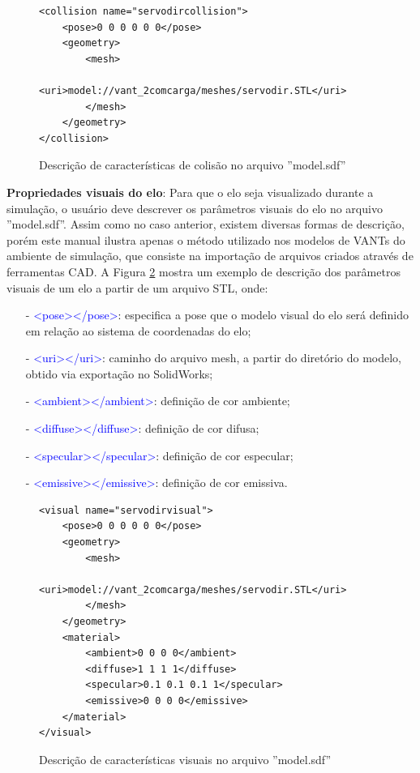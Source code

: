 \begin{figure}[ht!]
\begin{verbatim}
<collision name="servodircollision">
	<pose>0 0 0 0 0 0</pose>
	<geometry>
		<mesh>
			<uri>model://vant_2comcarga/meshes/servodir.STL</uri>
		</mesh>
	</geometry>
</collision>
\end{verbatim}
\vspace{-0.8cm}
\caption{Descrição de características de colisão no arquivo ''model.sdf''}
\label{colision}
\end{figure}

\noindent \textbf{Propriedades visuais do elo}: Para que o elo seja visualizado durante a simulação, o usuário deve descrever os parâmetros visuais do elo no arquivo ''model.sdf''. Assim como no caso anterior, existem diversas formas de descrição, porém este manual ilustra apenas o método utilizado nos modelos de VANTs do ambiente de simulação, que consiste na importação de arquivos criados através de ferramentas CAD. A Figura \ref{visual} mostra um exemplo de descrição dos parâmetros visuais de um elo a partir de um arquivo STL, 	
onde: \small
\begin{itemize}
\setlength{\itemsep}{1pt}
\setlength{\parskip}{0pt}
\setlength{\parsep}{0pt}
\item[-] \textcolor{blue}{<pose></pose>}: especifica a pose que o modelo visual do elo será definido em relação ao sistema de coordenadas do elo;
\item[-] \textcolor{blue}{<uri></uri>}: caminho do arquivo mesh, a partir do diretório do modelo, obtido via exportação no SolidWorks;
\item[-] \textcolor{blue}{<ambient></ambient>}: definição de cor ambiente;
\item[-] \textcolor{blue}{<diffuse></diffuse>}: definição de cor difusa;
\item[-] \textcolor{blue}{<specular></specular>}: definição de cor especular;
\item[-] \textcolor{blue}{<emissive></emissive>}: definição de cor emissiva.
\end{itemize} \normalsize

\begin{figure}[ht!]
\begin{verbatim}
<visual name="servodirvisual">
	<pose>0 0 0 0 0 0</pose>
	<geometry>
		<mesh>
			<uri>model://vant_2comcarga/meshes/servodir.STL</uri>
		</mesh>
	</geometry>
	<material>
		<ambient>0 0 0 0</ambient>
		<diffuse>1 1 1 1</diffuse>
		<specular>0.1 0.1 0.1 1</specular>
		<emissive>0 0 0 0</emissive>
	</material>
</visual>
\end{verbatim}
\vspace{-0.8cm}
\caption{Descrição de características visuais no arquivo ''model.sdf''}
\label{visual}
\end{figure}

